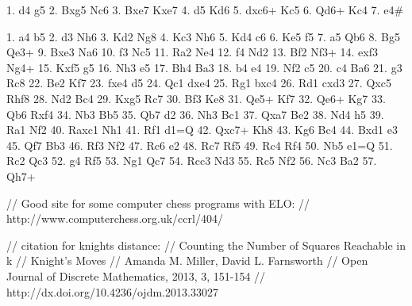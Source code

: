 
% 


1. d4 g5 2. Bxg5 Nc6 3. Bxe7 Kxe7 4. d5 Kd6
5. dxc6+ Kc5 6. Qd6+ Kc4 7. e4#

1. a4 b5 2. d3 Nh6 3. Kd2 Ng8 4. Kc3 Nh6
5. Kd4 c6 6. Ke5 f5 7. a5 Qb6 8. Bg5 Qe3+
9. Bxe3 Na6 10. f3 Nc5 11. Ra2 Ne4 12. f4 Nd2
13. Bf2 Nf3+ 14. exf3 Ng4+ 15. Kxf5 g5 16. Nh3 e5
17. Bh4 Ba3 18. b4 e4 19. Nf2 c5 20. c4 Ba6
21. g3 Rc8 22. Be2 Kf7 23. fxe4 d5 24. Qc1 dxe4
25. Rg1 bxc4 26. Rd1 cxd3 27. Qxc5 Rhf8 28. Nd2 Bc4
29. Kxg5 Rc7 30. Bf3 Ke8 31. Qe5+ Kf7 32. Qe6+ Kg7
33. Qb6 Rxf4 34. Nb3 Bb5 35. Qb7 d2 36. Nh3 Bc1
37. Qxa7 Be2 38. Nd4 h5 39. Ra1 Nf2 40. Raxc1 Nh1
41. Rf1 d1=Q 42. Qxc7+ Kh8 43. Kg6 Bc4 44. Bxd1 e3
45. Qf7 Bb3 46. Rf3 Nf2 47. Rc6 e2 48. Rc7 Rf5
49. Rc4 Rf4 50. Nb5 e1=Q 51. Rc2 Qc3 52. g4 Rf5
53. Ng1 Qc7 54. Rcc3 Nd3 55. Rc5 Nf2 56. Nc3 Ba2
57. Qh7+

// Good site for some computer chess programs with ELO:
// http://www.computerchess.org.uk/ccrl/404/


// citation for knights distance:
// Counting the Number of Squares Reachable in k
// Knight's Moves
// Amanda M. Miller, David L. Farnsworth
// Open Journal of Discrete Mathematics, 2013, 3, 151-154
// http://dx.doi.org/10.4236/ojdm.2013.33027 
